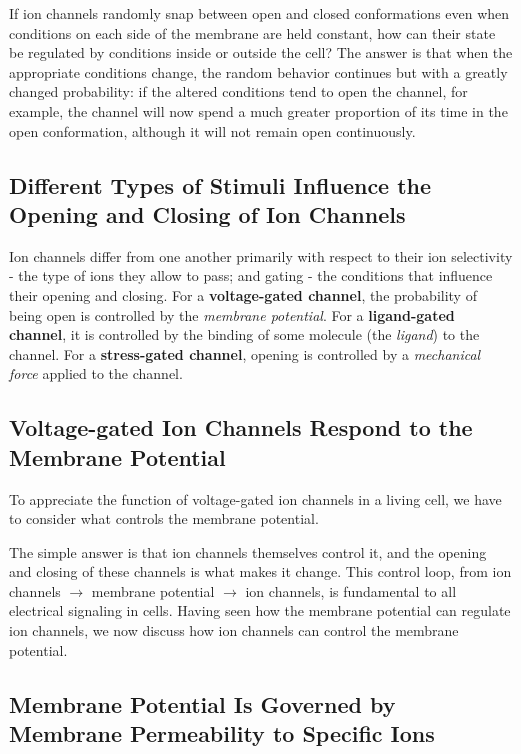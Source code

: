 If ion channels randomly snap between open and closed conformations
even when conditions on each side of the membrane are held constant,
how can their state be regulated by conditions inside or outside the cell?
The answer is that when the appropriate conditions change, the random
behavior continues but with a greatly changed probability: if the altered
conditions tend to open the channel, for example, the channel will now
spend a much greater proportion of its time in the open conformation,
although it will not remain open continuously.

\subsection{Different Types of Stimuli Influence the Opening and Closing of Ion Channels}

Ion channels differ from one another primarily with respect to their ion selectivity - the type of ions they allow to pass; and
gating - the conditions that influence their opening and closing. For a
\textbf{voltage-gated channel}, the probability of being open is controlled by
the \textit{membrane potential}. For a \textbf{ligand-gated channel}, it
is controlled by the binding of some molecule (the \textit{ligand}) to the channel.
For a \textbf{stress-gated channel}, opening is controlled
by a \textit{mechanical force} applied to the channel.

\subsection{Voltage-gated Ion Channels Respond to the Membrane Potential}

To appreciate the function of voltage-gated ion channels in a living cell,
we have to consider what controls the membrane potential. 

The simple answer is that ion channels themselves control it, and the opening and
closing of these channels is what makes it change. This control loop, from
ion channels $\rightarrow$ membrane potential $\rightarrow$ ion channels, is fundamental to
all electrical signaling in cells. Having seen how the membrane potential
can regulate ion channels, we now discuss how ion channels can control
the membrane potential.

\subsection{Membrane Potential Is Governed by Membrane Permeability to Specific Ions}

